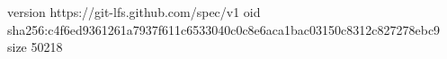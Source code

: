 version https://git-lfs.github.com/spec/v1
oid sha256:c4f6ed9361261a7937f611c6533040c0c8e6aca1bac03150c8312c827278ebc9
size 50218

